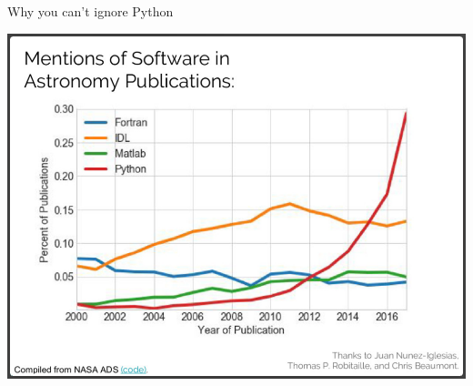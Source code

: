 \documentclass[aspectratio=169]{beamer}
\begin{document}
\begin{frame}{Why you can't ignore Python}
\vspace{0.25 cm}
\begin{center}
\includegraphics[width=0.7\linewidth]{mentions-of-programming-languages.png}
\end{center}
\end{frame}
\end{document}
